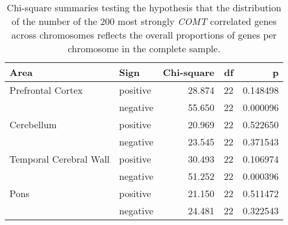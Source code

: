 \begin{longtable}{llrrr}
\caption{Chi-square summaries testing the hypothesis that the distribution of the number of the 200 most strongly  \textit{COMT} correlated genes across chromosomes reflects the overall proportions of genes per chromosome in the complete sample.} \\ 
  \toprule
Area & Sign & Chi-square & df & p \\ 
  \midrule
Prefrontal Cortex & positive & 28.874 & 22 & 0.148498 \\ 
   & negative & 55.650 & 22 & 0.000096 \\ 
  Cerebellum & positive & 20.969 & 22 & 0.522650 \\ 
   & negative & 23.545 & 22 & 0.371543 \\ 
  Temporal Cerebral Wall & positive & 30.493 & 22 & 0.106974 \\ 
   & negative & 51.252 & 22 & 0.000396 \\ 
  Pons & positive & 21.150 & 22 & 0.511472 \\ 
   & negative & 24.481 & 22 & 0.322543 \\ 
   \bottomrule
\end{longtable}
